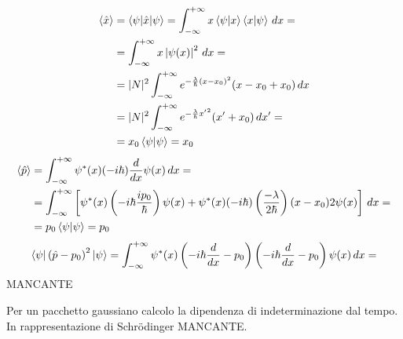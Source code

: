 \begin{align*}
\braket{\hat{x}} &= \braket{\psi|\hat{x}|\psi} = \int_{-\infty}^{+\infty} x \braket{\psi|x} \braket{x|\psi} \, dx = \\
&= \int_{-\infty}^{+\infty} x \left| \psi(x) \right|^2 \, dx = \\
&= |N|^2 \int_{-\infty}^{+\infty} e^{-\frac{\lambda}{\hbar}(x - x_0)^2} (x - x_0 + x_0) \, dx \\
&= |N|^2 \int_{-\infty}^{+\infty} e^{-\frac{\lambda}{\hbar} {x'}^2} (x' + x_0) \, dx' = \\
&= x_0 \braket{\psi|\psi} = x_0
\end{align*}
\begin{align*}
\braket{\hat{p}} &= \int_{-\infty}^{+\infty} \psi^*(x) (-i\hbar) \frac{d}{dx} \psi(x) \, dx = \\
&= \int_{-\infty}^{+\infty} \left[ \psi^*(x) \left( -i\hbar \frac{i p_0}{\hbar} \right) \psi(x) + \psi^*(x) (-i\hbar) \left(\frac{-\lambda}{2\hbar}\right)(x - x_0) 2 \psi(x) \right] \, dx = \\
&= p_0 \braket{\psi|\psi} = p_0
\end{align*}
\[
\braket{\psi|\left( \hat{p} - p_0 \right)^2|\psi} = \int_{-\infty}^{+\infty} \psi^*(x) \left( -i\hbar \frac{d}{dx} - p_0 \right) \left( -i\hbar \frac{d}{dx} - p_0 \right) \psi(x) \, dx =
\]
MANCANTE

\bigskip
\noindent
Per un pacchetto gaussiano calcolo la dipendenza di indeterminazione dal tempo. In rappresentazione di Schr\"odinger MANCANTE.

